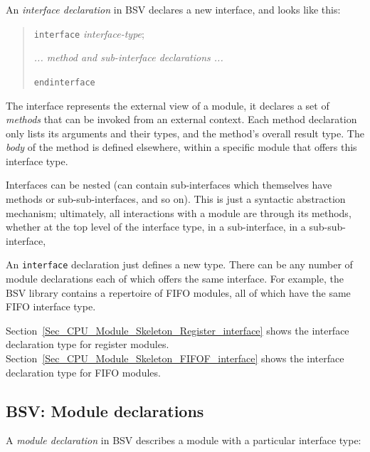 
An \emph{interface declaration} in BSV declares a new interface, and
looks like this:

\begin{quote}
{\tt interface} \emph{interface-type};

\hmm \emph{... method and sub-interface declarations ...}

{\tt endinterface}
\end{quote}

The interface represents the external view of a module, {\ie} it
declares a set of \emph{methods} that can be invoked from an external
context.  Each method declaration only lists its arguments and their
types, and the method's overall result type.  The \emph{body} of the
method is defined elsewhere, within a specific module that offers this
interface type.

Interfaces can be nested (can contain sub-interfaces which themselves
have methods or sub-sub-interfaces, and so on).  This is just a
syntactic abstraction mechanism; ultimately, all interactions with a
module are through its methods, whether at the top level of the
interface type, in a sub-interface, in a sub-sub-interface, {\etc}

An \verb|interface| declaration just defines a new type.  There can be
any number of module declarations each of which offers the same
interface.  For example, the BSV library contains a repertoire of FIFO
modules, all of which have the same FIFO interface type.

Section~\ref{Sec_CPU_Module_Skeleton_Register_interface} shows the
interface declaration type for register modules.
Section~\ref{Sec_CPU_Module_Skeleton_FIFOF_interface} shows the
interface declaration type for FIFO modules.


\subsection{BSV: Module declarations}

\label{Sec_CPU_Module_Skeleton_module_declarations}


A \emph{module declaration} in BSV describes a module with a
particular interface type:

